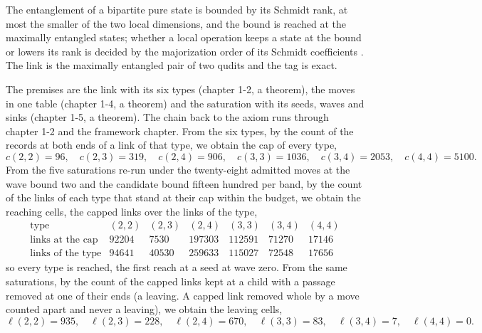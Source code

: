 \begin{chbridge}
The entanglement of a bipartite pure state is bounded by its Schmidt rank, at most the smaller of the two local dimensions, and the bound is reached at the maximally entangled states; whether a local operation keeps a state at the bound or lowers its rank is decided by the majorization order of its Schmidt coefficients \cite{Schmidt1907,Nielsen1999}. The link is the maximally entangled pair of two qudits and the tag is exact.
\end{chbridge}
\begin{chproof}[exact]
The premises are the link with its six types (chapter 1-2, a theorem), the moves in one table (chapter 1-4, a theorem) and the saturation with its seeds, waves and sinks (chapter 1-5, a theorem). The chain back to the axiom runs through chapter 1-2 and the framework chapter. From the six types, by the count of the records at both ends of a link of that type, we obtain the cap of every type,
\begin{equation}
c(2,2)=96,\quad c(2,3)=319,\quad c(2,4)=906,\quad c(3,3)=1036,\quad c(3,4)=2053,\quad c(4,4)=5100 .
\end{equation}
From the five saturations re-run under the twenty-eight admitted moves at the wave bound two and the candidate bound fifteen hundred per band, by the count of the links of each type that stand at their cap within the budget, we obtain the reaching cells, the capped links over the links of the type,
\begin{equation}
\begin{array}{lrrrrrr}
\text{type} & (2,2) & (2,3) & (2,4) & (3,3) & (3,4) & (4,4)\\
\text{links at the cap} & 92204 & 7530 & 197303 & 112591 & 71270 & 17146\\
\text{links of the type} & 94641 & 40530 & 259633 & 115027 & 72548 & 17656
\end{array}
\end{equation}
so every type is reached, the first reach at a seed at wave zero. From the same saturations, by the count of the capped links kept at a child with a passage removed at one of their ends (a leaving. A capped link removed whole by a move counted apart and never a leaving), we obtain the leaving cells,
\begin{equation}
\ell(2,2)=935,\quad \ell(2,3)=228,\quad \ell(2,4)=670,\quad \ell(3,3)=83,\quad \ell(3,4)=7,\quad \ell(4,4)=0 .
\end{equation}

\end{chproof}
